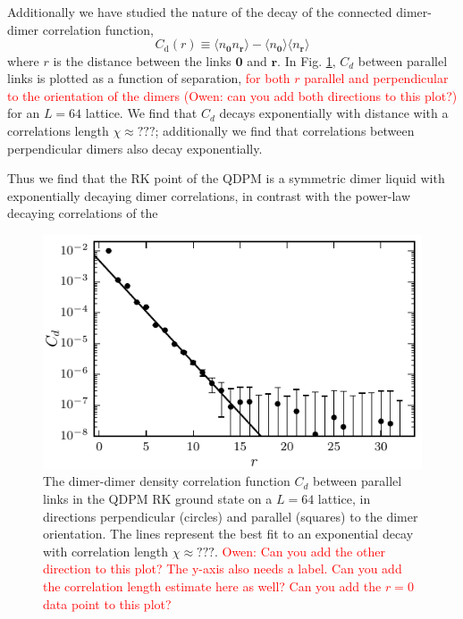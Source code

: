 \documentclass[twocolumn,prb,aps,floatfix,superscriptaddress]{revtex4-1}
\newcommand{\figref}[1]{Fig. \ref{#1}}
\newcommand{\note}[1]{\textcolor{red}{#1}}
\begin{document}
Additionally we have studied the nature of the decay of the connected dimer-dimer correlation function,
  \begin{equation}
    C_{\mathrm{d}} \left(r\right) \equiv \langle n_{\bm{0}} n_{\bm{r}} \rangle - \langle n_{\bm{0}} \rangle   \langle n_{\bm{r}} \rangle   
\end{equation}
where $r$ is the distance between the links $\bm{0}$ and $\bm{r}$. In \figref{fig:spatial_dmr_cor}, $C_d$ between parallel links is plotted as a function of separation, \textcolor{red}{for both $r$ parallel and perpendicular to the orientation of the dimers} \note{(Owen: can you add both directions to this plot?)} for an $L=64$ lattice. We find that $C_d$ decays exponentially with distance with a correlations length  $\chi\approx???$; additionally we find that correlations between perpendicular dimers also decay exponentially.

Thus we find that the RK point of the QDPM is a symmetric dimer liquid with exponentially decaying dimer correlations, in contrast with the power-law decaying correlations of the 

\begin{figure}
    \centering
    \includegraphics[width=1.0\columnwidth]{spatial_cors_parallel.pdf}
    \caption{The dimer-dimer density correlation function $C_d$ between parallel links in the QDPM RK ground state on a $L=64$ lattice, in directions perpendicular (circles) and parallel (squares) to the dimer orientation.  The lines represent the best fit to an exponential decay with correlation length $\chi\approx???$. \note{Owen: Can you add the other direction to this plot? The y-axis also needs a label. Can you add the correlation length estimate here as well? Can you add the $r=0$ data point to this plot?}}
    \label{fig:spatial_dmr_cor}
\end{figure}
\end{document}
